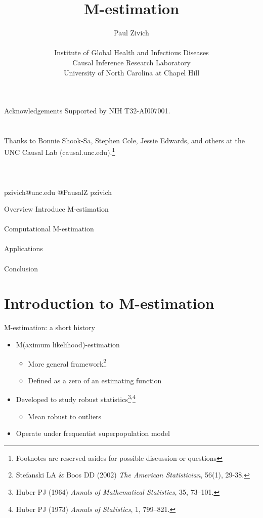 \documentclass{beamer}
\title[M-estimation]{M-estimation}
\author[Paul Zivich]{Paul Zivich \\~\\ Institute of Global Health and Infectious Diseases \\ Causal Inference Research Laboratory \\ University of North Carolina at Chapel Hill}
\begin{document}
\begin{frame}[plain]
    \maketitle
\end{frame}

\begin{frame}{Acknowledgements}
	Supported by NIH T32-AI007001.\\~\\~\\
	
	Thanks to Bonnie Shook-Sa, Stephen Cole, Jessie Edwards, and others at the UNC Causal Lab (causal.unc.edu).\footnote[frame]{Footnotes are reserved asides for possible discussion or questions}\\~\\~\\~\\
	
	\faEnvelope \quad pzivich@unc.edu \qquad
	\faTwitter \quad @PausalZ \qquad
	\faGithub \quad pzivich\\
\end{frame}

\begin{frame}{Overview}
	Introduce M-estimation\\~\\
	Computational M-estimation\\~\\
	Applications\\~\\
	Conclusion
\end{frame}

\section{Introduction to M-estimation}

\begin{frame}{M-estimation: a short history}
	\begin{itemize}
		\item M(aximum likelihood)-estimation
		\begin{itemize}
			\item More general framework\footnote[frame]{Stefanski LA \& Boos DD (2002) \textit{The American Statistician}, 56(1), 29-38.}
			\item Defined as a zero of an estimating function
		\end{itemize}
		\item Developed to study robust statistics\footnote[frame]{Huber PJ (1964) \textit{Annals of Mathematical Statistics}, 35, 73–101.}\textsuperscript{,}\footnote[frame]{Huber PJ (1973) \textit{Annals of Statistics}, 1, 799–821.}
		\begin{itemize}
			\item Mean robust to outliers
		\end{itemize}
		\item Operate under frequentist superpopulation model
	\end{itemize}
\end{frame}
\end{document}
